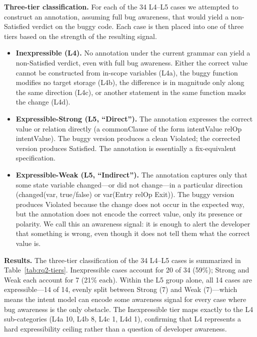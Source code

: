 \documentclass[pdflatex,sn-basic]{sn-jnl}%
\theoremstyle{thmstyleone}%
\theoremstyle{thmstyletwo}%
\theoremstyle{thmstylethree}%
\begin{document}
\smallskip
\noindent\textbf{Three-tier classification.}
For each of the 34 L4--L5 cases we attempted to construct an annotation, assuming full bug awareness, that would yield a non-Satisfied verdict on the buggy code.
Each case is then placed into one of three tiers based on the strength of the resulting signal.

\begin{itemize}
  \item \textbf{Inexpressible (L4).} No annotation under the current grammar can yield a non-Satisfied verdict, even with full bug awareness. Either the correct value cannot be constructed from in-scope variables (L4a), the buggy function modifies no target storage (L4b), the difference is in magnitude only along the same direction (L4c), or another statement in the same function masks the change (L4d).
  \item \textbf{Expressible-Strong (L5, ``Direct'').} The annotation expresses the correct value or relation directly (a commonClause of the form intentValue relOp intentValue). The buggy version produces a clean Violated; the corrected version produces Satisfied. The annotation is essentially a fix-equivalent specification.
  \item \textbf{Expressible-Weak (L5, ``Indirect'').} The annotation captures only that some state variable changed---or did not change---in a particular direction (changed(var, true/false) or var(Entry relOp Exit)). The buggy version produces Violated because the change does not occur in the expected way, but the annotation does not encode the correct value, only its presence or polarity. We call this an awareness signal: it is enough to alert the developer that something is wrong, even though it does not tell them what the correct value is.
\end{itemize}

\smallskip
\noindent\textbf{Results.}
The three-tier classification of the 34 L4--L5 cases is summarized in Table~\ref{tab:rq2-tiers}.
Inexpressible cases account for 20 of 34 (59\%); Strong and Weak each account for 7 (21\% each).
Within the L5 group alone, all 14 cases are expressible---14 of 14, evenly split between Strong (7) and Weak (7)---which means the intent model can encode some awareness signal for every case where bug awareness is the only obstacle.
The Inexpressible tier maps exactly to the L4 sub-categories (L4a 10, L4b 8, L4c 1, L4d 1), confirming that L4 represents a hard expressibility ceiling rather than a question of developer awareness.
\end{document}
